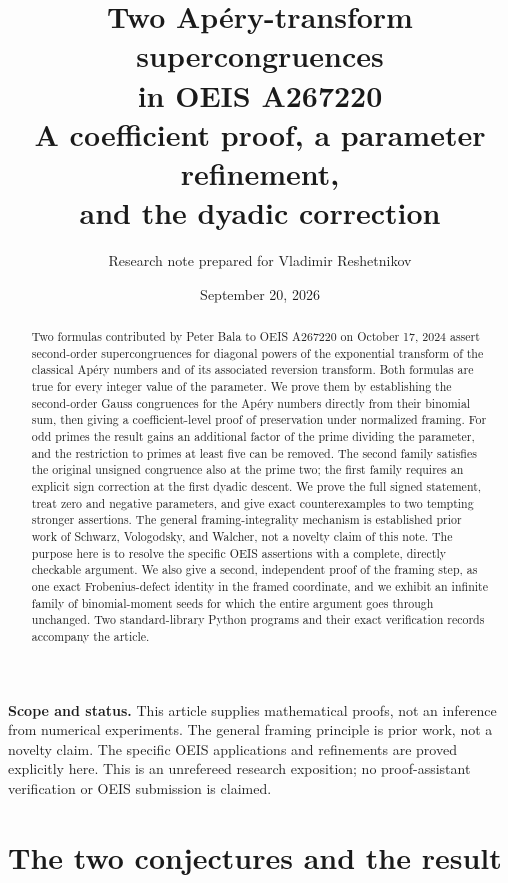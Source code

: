 \documentclass[11pt,letterpaper]{article}
\title{\textbf{Two Ap\'ery-transform supercongruences\\in OEIS A267220}\\[0.45em]
\large A coefficient proof, a parameter refinement,\\and the dyadic correction}
\author{Research note prepared for Vladimir Reshetnikov}
\date{September 20, 2026}
\numberwithin{equation}{section}
\theoremstyle{definition}
\begin{document}
\maketitle
\thispagestyle{empty}

\begin{abstract}
Two formulas contributed by Peter Bala to OEIS A267220 on October 17,
2024 assert second-order supercongruences for diagonal powers of the
exponential transform of the classical Ap\'ery numbers and of
its associated reversion transform. Both formulas are true for every
integer value of the parameter. We prove them by establishing the
second-order Gauss congruences for the Ap\'ery numbers directly from their
binomial sum, then giving a coefficient-level proof of preservation under
normalized framing. For odd primes the result gains an additional factor
of the prime dividing the parameter, and the restriction to primes at
least five can be removed. The second family satisfies the original
unsigned congruence also at the prime two; the first family requires an
explicit sign correction at the first dyadic descent. We prove the full
signed statement, treat zero and negative parameters, and give exact
counterexamples to two tempting stronger assertions. The general
framing-integrality mechanism is established prior work of Schwarz,
Vologodsky, and Walcher, not a novelty claim of this note. The purpose here
is to resolve the specific OEIS assertions with a complete, directly
checkable argument. We also give a second, independent proof of the
framing step, as one exact Frobenius-defect identity in the framed
coordinate, and we exhibit an infinite family of binomial-moment seeds
for which the entire argument goes through unchanged. Two
standard-library Python programs and their exact
verification records accompany the article.
\end{abstract}

\vspace{2pt}
\noindent\textbf{Scope and status.} This article supplies mathematical proofs,
not an inference from numerical experiments. The general framing principle
is prior work, not a novelty claim. The specific OEIS applications and
refinements are proved explicitly here. This is an unrefereed research
exposition; no proof-assistant verification or OEIS submission is claimed.

\section{The two conjectures and the result}\label{sec:target}
\end{document}
